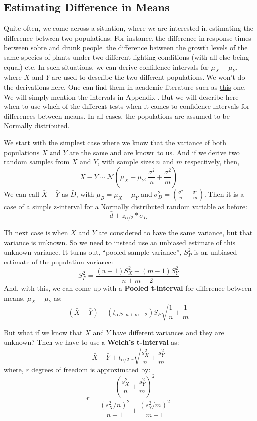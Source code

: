 \subsection {Estimating Difference in Means}
Quite often, we come across a situation, where we are interested in estimating the difference between two populations: For instance, the difference in response times between sobre and drunk people, the difference between the growth levels of the same species of plants under two different lighting conditions (with all else being equal) etc. In such situations, we can derive confidence intervals for \( \mu_X - \mu_Y \), where $X$ and $Y$ are used to describe the two different populations. We won't do the derivations here. One can find them in academic literature such as \href{https://online.stat.psu.edu/stat414/node/200/}{this} one. We will simply mention the intervals in Appendix . But we will describe here when to use which of the different tests when it comes to confidence intervals for differences between means. In all cases, the populations are assumed to be Normally distributed.

We start with the simplest case where we know that the variance of both populations $X$ and $Y$ are the same and are known to us. And if we derive two random samples from $X$ and $Y$, with sample sizes $n$ and $m$ respectively, then,
	\[ \bar{X}-\bar{Y} \sim \mathcal{N}\left(\mu_X - \mu_Y, \frac{\sigma^2}{n} + \frac{\sigma^2}{m}\right) \]
We can call \( \bar{X} - \bar{Y} \) as $\bar{D}$, with \( \mu_D = \mu_X - \mu_Y \) and \( \sigma^2_D = \left(\frac{\sigma^2}{n} + \frac{\sigma^2}{m}\right) \). Then it is a case of a simple z-interval for a Normally distributed random variable as before:
	\[ \bar{d} \pm z_{\alpha/2}*\sigma_D \]

Th next case is when $X$ and $Y$ are considered to have the same variance, but that variance is unknown. So we need to instead use an unbiased estimate of this unknown variance. It turns out, ``pooled sample variance'', $S^2_P$ is an unbiased estimate of the population variance:
	\[ S_P^2=\dfrac{(n-1)S^2_X+(m-1)S^2_Y}{n+m-2} \]
And, with this, we can come up with a \textbf{Pooled t-interval} for difference between means. $\mu_X-\mu_Y$ as: 
	\[ (\bar{X}-\bar{Y})\pm (t_{\alpha/2,n+m-2}) S_P \sqrt{\dfrac{1}{n}+\dfrac{1}{m}} \]

But what if we know that $X$ and $Y$ have different variances and they are unknown? Then we have to use a \textbf{Welch's t-interval} as:
	\[ \bar{X}-\bar{Y}\pm t_{\alpha/2,r}\sqrt{\dfrac{s^2_X}{n}+\dfrac{s^2_Y}{m}} \]
where, $r$ degrees of freedom is approximated by:
	\[ r=\dfrac{\left(\dfrac{s^2_X}{n}+\dfrac{s^2_Y}{m}\right)^2}{\dfrac{(s^2_X/n)^2}{n-1}+\dfrac{(s^2_Y/m)^2}{m-1}} \]

